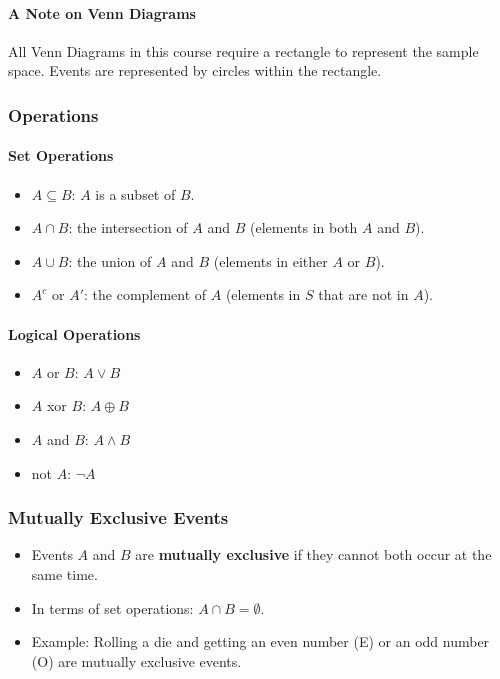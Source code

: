 \paragraph*{A Note on Venn Diagrams}
All Venn Diagrams in this course require a rectangle to represent the sample space. Events are represented by circles within the rectangle.

\hrulefill

\subsubsection*{Operations}
\paragraph*{Set Operations}
\begin{itemize}
    \item $A \subseteq B$: $A$ is a subset of $B$.
    \item $A \cap B$: the intersection of $A$ and $B$ (elements in both $A$ and $B$).
    \item $A \cup B$: the union of $A$ and $B$ (elements in either $A$ or $B$).
    \item $A^c$ or $A'$: the complement of $A$ (elements in $S$ that are not in $A$).
\end{itemize}

\paragraph*{Logical Operations}
\begin{itemize}
    \item $A$ or $B$: $A \lor B$
    \item $A$ xor $B$: $A \oplus B$
    \item $A$ and $B$: $A \land B$
    \item not $A$: $\neg A$
\end{itemize}

\subsubsection*{Mutually Exclusive Events}
\begin{itemize}
    \item Events $A$ and $B$ are \textbf{mutually exclusive} if they cannot both occur at the same time.
    \item In terms of set operations: $A \cap B = \emptyset$.
    \item Example: Rolling a die and getting an even number (E) or an odd number (O) are mutually exclusive events.
\end{itemize}

